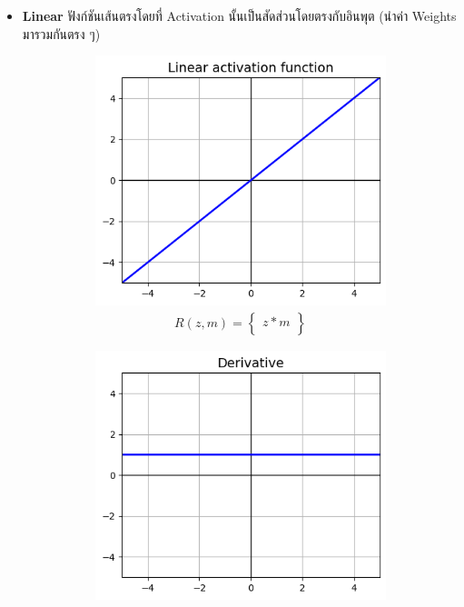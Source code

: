 \begin{itemize}
    \item \textbf{Linear} ฟังก์ชันเส้นตรงโดยที่ Activation นั้นเป็นสัดส่วนโดยตรงกับอินพุต (นำค่า Weights มารวมกันตรง ๆ)
    \begin{figure}[H]
        \centering
        \begin{subfigure}{0.5\textwidth}
            \centering
            \includegraphics[width=0.9\linewidth]{fig/actfunc_linear.png}
            \caption{%
                \begin{equation}
                    \begin{split}R(z,m) = \begin{Bmatrix} z*m \\
                    \end{Bmatrix}\end{split}
                \end{equation}
            }
            \label{fig:actfunc_lin}
        \end{subfigure}%
        \begin{subfigure}{0.5\textwidth}
            \centering
            \includegraphics[width=0.9\linewidth]{fig/actfunc_linear_der.png}

\end{subfigure}
\end{figure}
\end{itemize}
